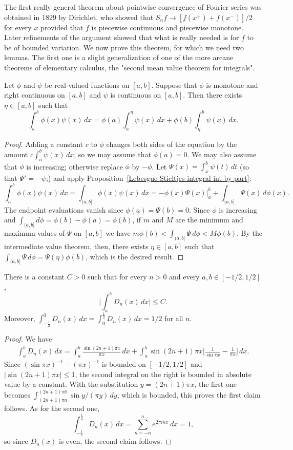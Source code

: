 The first really general theorem about pointwise convergence of Fourier series was obtained in 1829 by Dirichlet, who showed that $S_nf\to[f(x^+)+f(x^-)]/2$ for every $x$ provided that $f$ is piecewise continuous and piecewise monotone. Later refinements of the argument showed that what is really needed is for $f$ to be of bounded variation. We now prove this theorem, for which we need two lemmas. The first one is a slight generalization of one of the more arcane theorems of elementary calculus, the "second mean value theorem for integrals".
\begin{lemma}\label{second mean value theorem integral}
Let $\phi$ and $\psi$ be real-valued functions on $[a,b]$. Suppose that $\phi$ is monotone and right continuous on $[a,b]$ and $\psi$ is continuous on $[a,b]$. Then there exists $\eta\in[a,b]$ such that
\[\int_{a}^{b}\phi(x)\psi(x)\,dx=\phi(a)\int_{a}^{\eta}\psi(x)\,dx+\phi(b)\int_{\eta}^{b}\psi(x)\,dx.\]
\end{lemma}
\begin{proof}
Adding a constant $c$ to $\phi$ changes both sides of the equation by the amount $c\int_a^b\psi(x)\,dx$, so we may assume that $\phi(a)=0$. We may also assume that $\phi$ is increasing; otherwise replace $\phi$ by $-\phi$. Let $\Psi(x)=\int_x^b\psi(t)\,dt$ (so that $\Psi'=-\psi$;) and apply Proposition~\ref{Lebesgue-Stieltjes integral int by part}: 
\[\int_{a}^{b}\phi(x)\psi(x)\,dx=\int_{(a,b]}\phi(x)\psi(x)\,dx=-\phi(x)\Psi(x)\Big|_{a}^{b}+\int_{(a,b]}\Psi(x)\,d\phi(x).\]
The endpoint evaluations vanish since $\phi(a)=\Psi(b)=0$. Since $\phi$ is increasing and $\int_{(a,b]}d\phi=\phi(b)-\phi(a)=\phi(b)$, if $m$ and $M$ are the minimum and maximum values of $\Psi$ on $[a,b]$ we have $m\phi(b)< \int_{(a,b]}\Psi\,d\phi<M\phi(b)$. By the intermediate value theorem, then, there exists $\eta\in[a,b]$ such that $\int_{(a,b]}\Psi\,d\phi=\Psi(\eta)\phi(b)$, which is the desired result.
\end{proof}
\begin{lemma}\label{Drichlet kernel bounded}
There is a constant $C>0$ such that for every $n>0$ and every $a,b\in[-1/2,1/2]$,
\[\Big|\int_{a}^{b}D_n(x)\,dx\Big|\leq C.\]
Moreover, $\int_{-\frac{1}{2}}^{0}D_n(x)\,dx=\int_{0}^{\frac{1}{2}}D_n(x)\,dx=1/2$ for all $n$.
\end{lemma}
\begin{proof}
We have
\begin{align*}
\int_{a}^{b}D_n(x)\,dx=\int_{a}^{b}\frac{\sin(2n+1)\pi x}{\pi x}\,dx+\int_{a}^{b}\sin(2n+1)\pi x\Big[\frac{1}{\sin\pi x}-\frac{1}{\pi x}\Big]\,dx.
\end{align*}
Since $(\sin\pi x)^{-1}-(\pi x)^{-1}$ is bounded on $[-1/2,1/2]$ and $|\sin(2n+1)\pi x|\leq 1$, the second integral on the right is bounded in absolute value by a constant. With the substitution $y=(2n+1)\pi x$, the first one becomes $\int_{(2n+1)\pi a}^{(2n+1)\pi b}\sin y/(\pi y)\,dy$, which is bounded, this proves the first claim follows. As for the second one,
\[\int_{-\frac{1}{2}}^{\frac{1}{2}}D_n(x)\,dx=\sum_{\kappa=-n}^{n}e^{2\pi i\kappa x}\,dx=1,\]
so since $D_n(x)$ is even, the second claim follows.
\end{proof}
